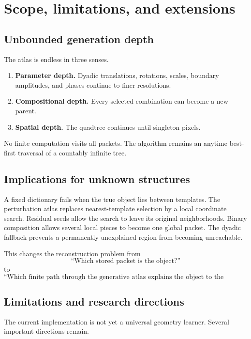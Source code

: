 \documentclass[11pt]{article}
\theoremstyle{definition}
\theoremstyle{remark}
\begin{document}
\FloatBarrier
\FloatBarrier
\section{Scope, limitations, and extensions}
\subsection{Unbounded generation depth}
The atlas is endless in three senses.

\begin{enumerate}
\item \textbf{Parameter depth.} Dyadic translations, rotations, scales, boundary amplitudes, and phases continue to finer resolutions.
\item \textbf{Compositional depth.} Every selected combination can become a new parent.
\item \textbf{Spatial depth.} The quadtree continues until singleton pixels.
\end{enumerate}

No finite computation visits all packets. The algorithm remains an anytime best-first traversal of a countably infinite tree.

\FloatBarrier
\subsection{Implications for unknown structures}
A fixed dictionary fails when the true object lies between templates. The perturbation atlas replaces nearest-template selection by a local coordinate search. Residual seeds allow the search to leave its original neighborhoods. Binary composition allows several local pieces to become one global packet. The dyadic fallback prevents a permanently unexplained region from becoming unreachable.

This changes the reconstruction problem from
\[
\text{``Which stored packet is the object?''}
\]
to
\[
\boxed{
\text{``Which finite path through the generative atlas explains the object to the required tolerance?''}
}
\]

\FloatBarrier
\subsection{Limitations and research directions}
The current implementation is not yet a universal geometry learner. Several important directions remain.
\end{document}
